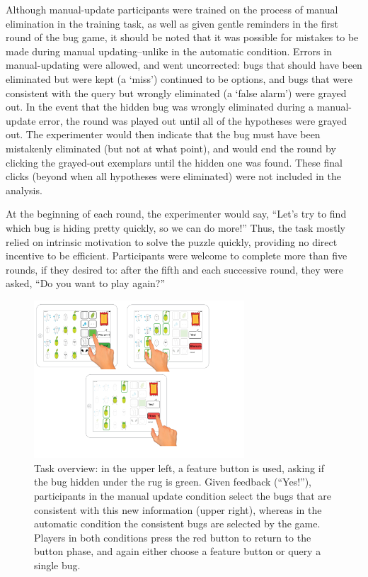 \documentclass[man,floatsintext]{apa6}
\begin{document}
Although manual-update participants were trained on the process of manual elimination in the 
training task, as well as given gentle reminders in the first round of the bug game, it should be 
noted that it was possible for mistakes to be made during manual updating--unlike in the automatic 
condition. Errors in manual-updating were allowed, and went uncorrected: bugs that should have been eliminated but were kept (a `miss') continued to be options, and bugs that were consistent with the query but wrongly eliminated (a `false alarm') were grayed out. In the event that the hidden bug was wrongly eliminated during a manual-update error, the round was played out until all of the hypotheses were grayed out. The experimenter would then indicate that the bug must have been mistakenly eliminated (but not at what point), and would end the round by clicking the grayed-out exemplars until the hidden one was found. These final clicks (beyond when all hypotheses were eliminated) were not included in the analysis.

At the beginning of each round, the experimenter would say, ``Let's try to find which bug is hiding pretty quickly, so we can do more!'' Thus, the task mostly relied on intrinsic motivation to solve the puzzle quickly, providing no direct incentive to be efficient. Participants were welcome to complete more than five rounds, if they desired to: after the fifth and each successive round, they were asked, ``Do you want to play again?''

\begin{figure}[!h]
  \centering
  \includegraphics[width=0.7\textwidth]{figures/task_overview}
  \caption{Task overview: in the upper left, a feature button is used, asking if the bug 
hidden under the rug is green. Given feedback (``Yes!''), participants in the manual 
update condition select the bugs that are consistent with this new information (upper 
right), whereas in the automatic condition the consistent bugs are selected by the 
game. Players in both conditions press the red button to return to the button phase, 
and again either choose a feature button or query a single bug.}
  \label{fig:task-overview}
\end{figure} 
\end{document}
